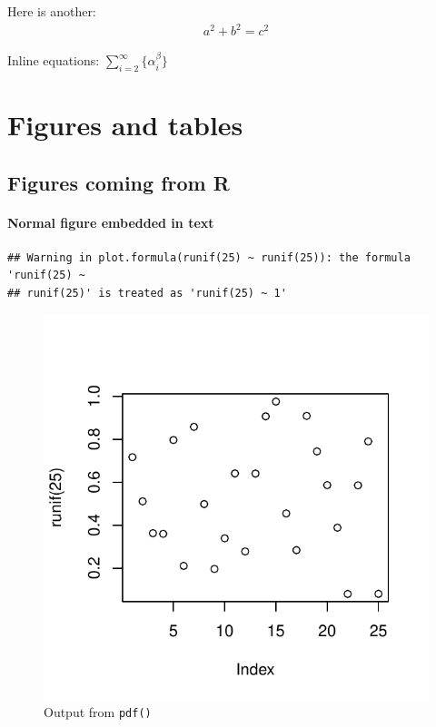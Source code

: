 \documentclass[useAMS,usenatbib,referee]{biom}
\begin{document}
Here is another: \begin{align}
a^2+b^2=c^2
\end{align}

Inline equations: \(\sum_{i = 2}^\infty\{\alpha_i^\beta\}\)

\hypertarget{figures-and-tables}{%
\section{Figures and tables}\label{figures-and-tables}}

\hypertarget{figures-coming-from-r}{%
\subsection{Figures coming from R}\label{figures-coming-from-r}}

\hypertarget{normal-figure-embedded-in-text}{%
\paragraph{Normal figure embedded in
text}\label{normal-figure-embedded-in-text}}

\begin{verbatim}
## Warning in plot.formula(runif(25) ~ runif(25)): the formula 'runif(25) ~
## runif(25)' is treated as 'runif(25) ~ 1'
\end{verbatim}

\begin{figure}
\centering
\includegraphics{final-project_files/figure-latex/fig2-1.pdf}
\caption{Output from \texttt{pdf()}}
\end{figure}
\end{document}
